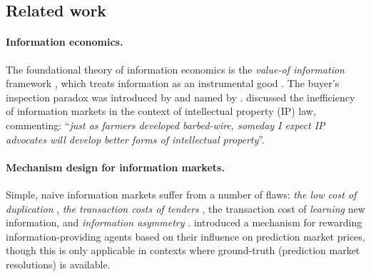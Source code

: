 

\subsection{Related work}
\label{rim:sec:related}


\paragraph{Information economics.} The foundational theory of information economics is the \emph{value-of information} framework , which treats information as an instrumental good . The buyer's inspection paradox was introduced by  and named by .  discussed the inefficiency of information markets in the context of intellectual property (IP) law, commenting: ``\emph{just as farmers developed barbed-wire, someday I expect IP advocates will develop better forms of intellectual property}''.

\paragraph{Mechanism design for information markets.} Simple, naive information markets suffer from a number of flaws: \emph{the low cost of duplication} , \emph{the transaction costs of tenders} , the transaction cost of \emph{learning} new information, and \emph{information asymmetry} .  introduced a mechanism for rewarding information-providing agents based on their influence on prediction market prices, though this is only applicable in contexts where ground-truth (prediction market resolutions) is available.


